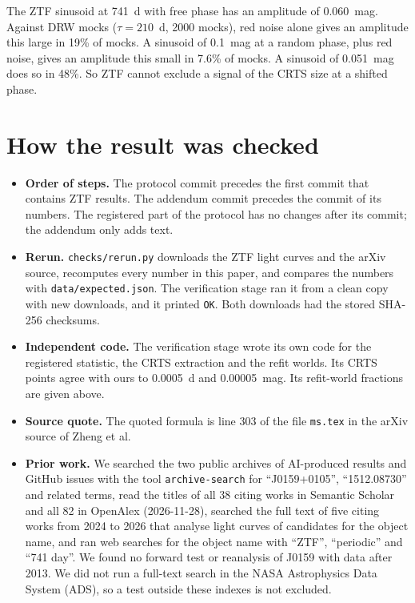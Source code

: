 \documentclass[11pt]{article}
\begin{document}
The ZTF sinusoid at 741~d with free phase has an amplitude of 0.060~mag. Against DRW mocks ($\tau = 210$~d, 2000 mocks), red noise alone gives an amplitude this large in 19\% of mocks. A sinusoid of 0.1~mag at a random phase, plus red noise, gives an amplitude this small in 7.6\% of mocks. A sinusoid of 0.051~mag does so in 48\%. So ZTF cannot exclude a signal of the CRTS size at a shifted phase.

\section{How the result was checked}
\label{sec:prior}

\begin{itemize}
\item \textbf{Order of steps.} The protocol commit precedes the first commit that contains ZTF results. The addendum commit precedes the commit of its numbers. The registered part of the protocol has no changes after its commit; the addendum only adds text.
\item \textbf{Rerun.} \texttt{checks/rerun.py} downloads the ZTF light curves and the arXiv source, recomputes every number in this paper, and compares the numbers with \texttt{data/expected.json}. The verification stage ran it from a clean copy with new downloads, and it printed \texttt{OK}. Both downloads had the stored SHA-256 checksums.
\item \textbf{Independent code.} The verification stage wrote its own code for the registered statistic, the CRTS extraction and the refit worlds. Its CRTS points agree with ours to 0.0005~d and 0.00005~mag. Its refit-world fractions are given above.
\item \textbf{Source quote.} The quoted formula is line 303 of the file \texttt{ms.tex} in the arXiv source of Zheng et al.
\item \textbf{Prior work.} We searched the two public archives of AI-produced results and GitHub issues with the tool \texttt{archive-search} for ``J0159+0105'', ``1512.08730'' and related terms, read the titles of all 38 citing works in Semantic Scholar and all 82 in OpenAlex (2026-11-28), searched the full text of five citing works from 2024 to 2026 that analyse light curves of candidates for the object name, and ran web searches for the object name with ``ZTF'', ``periodic'' and ``741 day''. We found no forward test or reanalysis of J0159 with data after 2013. We did not run a full-text search in the NASA Astrophysics Data System (ADS), so a test outside these indexes is not excluded.
\end{itemize}
\end{document}
